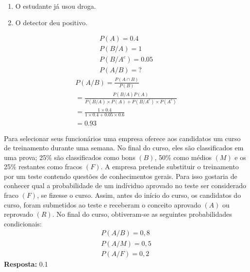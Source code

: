 \begin{description}
       \begin{enumerate}[label=\Alph*:]
         \item  O estudante já usou droga.
         \item  O detector deu positivo.
       \end{enumerate}
       \begin{align*}
         P(A)= 0.4 \\
         P( B / A )=1 \\
         P(B / A^c) = 0.05\\
         P(A / B)=?
       \end{align*}
       \begin{align*}
         P(A/B)= \frac{P(A \cap B)}{P(B)} \\
         = \frac{P(B/A)P(A)}{P(B/A)\times P(A) + P(B/A^c) \times P(A^c)}\\
         = \frac{1 \times 0.4}{1 \times 0.4 + 0.05 \times 0.6}\\
         =0.93
       \end{align*}
       \begin{exercise} Para selecionar seus funcionários uma empresa oferece aos candidatos 
       um curso de treinamento durante uma semana. No final do curso, eles são classificados
       em uma prova; 25\% são classificados como bons $(B)$, 50\% como médios $(M)$ e os 
       25\% restantes como fracos $(F)$. A empresa pretende substituir o treinamento por um teste 
       contendo questões de conhecimentos gerais. Para isso gostaria de conhecer qual a 
       probabilidade de um indíviduo aprovado no teste ser considerado fraco $(F)$, se 
       fizesse o curso. Assim, antes do início do curso, os candidatos do curso, foram 
       submetidos ao teste e receberam o conceito aprovado $(A)$ ou reprovado $(R)$. No final 
       do curso, obtiveram-se as seguintes probabilidades condicionais: 
       \begin{align*}
         P(A/B)= 0,8\\
         P(A/M) = 0,5\\
         P(A/F)=0,2
       \end{align*}
       \textbf{Resposta:} 0.1
     \end{exercise}
   \end{description}
